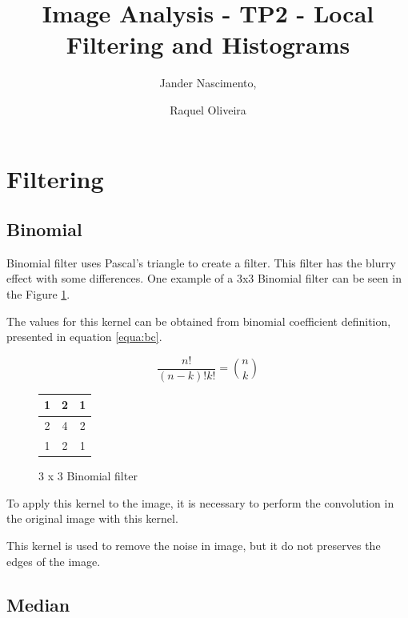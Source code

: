 \documentclass{article}
\begin{document}
\title{Image Analysis - TP2 - Local Filtering and Histograms}

\author{Jander Nascimento, 
\and Raquel Oliveira}

\maketitle

\section{Filtering}
	
	\subsection{Binomial}

		Binomial filter uses Pascal's triangle to create a filter. This filter has the blurry effect with some differences.
One example of a 3x3 Binomial filter can be seen in the Figure \ref{3x3binomial}.

The values for this kernel can be obtained from binomial coefficient definition, presented in equation \ref{equa:bc}.

\begin{equation}
\frac{n!}{(n-k)!k!}={n \choose k}
\label{equa:bc}
\end{equation}

\begin{figure}[H]
  \begin{center}
  \begin{tabular}{ | c | c | c | }
    \hline
    1 & 2 & 1 \\ \hline

    2 & 4 & 2 \\ \hline

    1 & 2 & 1 \\
    \hline
  \end{tabular}
  \end{center}
  \caption{3 x 3 Binomial filter\label{3x3binomial}}\end{figure}

		To apply this kernel to the image, it is necessary to perform the convolution in the original image with this kernel.

		This kernel is used to remove the noise in image, but it do not preserves the edges of the image. 
		
	\subsection{Median}
\end{document}
